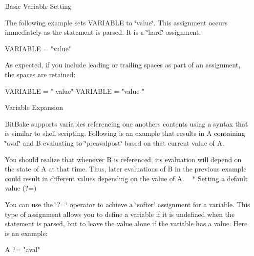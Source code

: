 \begin{DoxyItemize}
\item Basic Variable Setting
\begin{DoxyItemize}
\item The following example sets V\+A\+R\+I\+A\+B\+LE to \char`\"{}value\char`\"{}. This assignment occurs immediately as the statement is parsed. It is a \char`\"{}hard\char`\"{} assignment. 
\begin{DoxyCode}
VARIABLE = "value"
\end{DoxyCode}

\item As expected, if you include leading or trailing spaces as part of an assignment, the spaces are retained\+: 
\begin{DoxyCode}
VARIABLE = " value"
VARIABLE = "value "
\end{DoxyCode}

\end{DoxyItemize}
\item Variable Expansion
\begin{DoxyItemize}
\item Bit\+Bake supports variables referencing one another\textquotesingle{}s contents using a syntax that is similar to shell scripting. Following is an example that results in A containing \char`\"{}aval\char`\"{} and B evaluating to \char`\"{}preavalpost\char`\"{} based on that current value of A. 

\item You should realize that whenever B is referenced, its evaluation will depend on the state of A at that time. Thus, later evaluations of B in the previous example could result in different values depending on the value of A. ~\newline
$\ast$ Setting a default value (?=)
\item You can use the \char`\"{}?=\char`\"{} operator to achieve a \char`\"{}softer\char`\"{} assignment for a variable. This type of assignment allows you to define a variable if it is undefined when the statement is parsed, but to leave the value alone if the variable has a value. Here is an example\+: 
\begin{DoxyCode}
A ?= "aval"
\end{DoxyCode}


\end{DoxyItemize}
\end{DoxyItemize}
